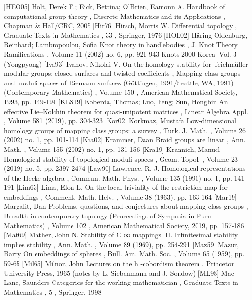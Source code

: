  [HEO05] Holt, Derek F.; Eick, Bettina; O’Brien, Eamonn A. Handbook of computational group theory , Discrete Mathematics and its Applications , Chapman \& Hall/CRC, 2005
 [Hir76] Hirsch, Morris W. Differential topology , Graduate Texts in Mathematics , 33 , Springer, 1976
 [HOL02] Häring-Oldenburg, Reinhard; Lambropoulou, Sofia Knot theory in handlebodies , J. Knot Theory Ramifications , Volume 11 (2002) no. 6, pp. 921-943 Knots 2000 Korea, Vol. 3 (Yongpyong)
 [Iva93] Ivanov, Nikolai V. On the homology stability for Teichmüller modular groups: closed surfaces and twisted coefficients , Mapping class groups and moduli spaces of Riemann surfaces (Göttingen, 1991/Seattle, WA, 1991) (Contemporary Mathematics) , Volume 150 , American Mathematical Society, 1993, pp. 149-194
 [KLS19] Koberda, Thomas; Luo, Feng; Sun, Hongbin An effective Lie–Kolchin theorem for quasi-unipotent matrices , Linear Algebra Appl. , Volume 581 (2019), pp. 304-323
 [Kor02] Korkmaz, Mustafa Low-dimensional homology groups of mapping class groups: a survey , Turk. J. Math. , Volume 26 (2002) no. 1, pp. 101-114
 [Kra02] Krammer, Daan Braid groups are linear , Ann. Math. , Volume 155 (2002) no. 1, pp. 131-156
 [Kra19] Krannich, Manuel Homological stability of topological moduli spaces , Geom. Topol. , Volume 23 (2019) no. 5, pp. 2397-2474
 [Law90] Lawrence, R. J. Homological representations of the Hecke algebra , Commun. Math. Phys. , Volume 135 (1990) no. 1, pp. 141-191
 [Lim63] Lima, Elon L. On the local triviality of the restriction map for embeddings , Comment. Math. Helv. , Volume 38 (1963), pp. 163-164
 [Mar19] Margalit, Dan Problems, questions, and conjectures about mapping class groups , Breadth in contemporary topology (Proceedings of Symposia in Pure Mathematics) , Volume 102 , American Mathematical Society, 2019, pp. 157-186
 [Mat69] Mather, John N. Stability of C ∞ mappings. II. Infinitesimal stability implies stability , Ann. Math. , Volume 89 (1969), pp. 254-291
 [Maz59] Mazur, Barry On embeddings of spheres , Bull. Am. Math. Soc. , Volume 65 (1959), pp. 59-65
 [Mil65] Milnor, John Lectures on the h -cobordism theorem , Princeton University Press, 1965 (notes by L. Siebenmann and J. Sondow)
 [ML98] Mac Lane, Saunders Categories for the working mathematician , Graduate Texts in Mathematics , 5 , Springer, 1998
